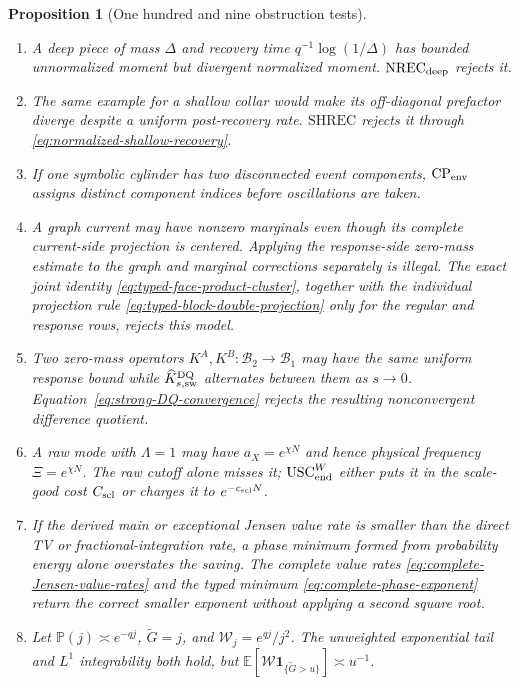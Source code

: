 \documentclass[11pt]{article}
\newtheorem{proposition}[theorem]{Proposition}
\newcommand{\cB}{\mathcal B}
\newcommand{\one}{\mathbf 1}
\begin{document}
\begin{proposition}[One hundred and nine obstruction tests]
\begin{enumerate}[label=\textup{(T\arabic*)}]
      the latter and never infers it from signed TV.
\item A deep piece of mass $\Delta$ and recovery time
      $q^{-1}\log(1/\Delta)$ has bounded unnormalized moment but divergent
      normalized moment.  $\mathrm{NREC}_{\rm deep}$ rejects it.
\item The same example for a shallow collar would make its off-diagonal
      prefactor diverge despite a uniform post-recovery rate.
      $\mathrm{SHREC}$ rejects it through
      \eqref{eq:normalized-shallow-recovery}.
\item If one symbolic cylinder has two disconnected event components,
      $\mathrm{CP}_{\rm env}$ assigns distinct component indices before
      oscillations are taken.
\item A graph current may have nonzero marginals even though its complete
      current-side projection is centered.  Applying the response-side
      zero-mass estimate to the graph and marginal corrections separately is
      illegal.  The exact joint identity
      \eqref{eq:typed-face-product-cluster}, together with the individual
      projection rule \eqref{eq:typed-block-double-projection} only for the
      regular and response rows, rejects this model.
\item Two zero-mass operators $K^A,K^B:\cB_2\to\cB_1$ may have the same
      uniform response bound while
      $\widehat K_{s,\rm sw}^{\rm DQ}$ alternates between them as $s\to0$.
      Equation~\eqref{eq:strong-DQ-convergence} rejects the resulting
      nonconvergent difference quotient.
\item A raw mode with $\Lambda=1$ may have $a_X=e^{\chi N}$ and hence
      physical frequency $\Xi=e^{\chi N}$.  The raw cutoff alone misses it;
      $\mathrm{USC}_{\rm end}^{W}$ either puts it in the scale-good cost
      $C_{\rm scl}$ or charges it to $e^{-c_{\rm scl}N}$.
\item If the derived main or exceptional Jensen value rate is smaller than
      the direct TV or fractional-integration rate, a phase minimum formed
      from probability energy alone overstates the saving.  The complete
      value rates \eqref{eq:complete-Jensen-value-rates} and the typed
      minimum \eqref{eq:complete-phase-exponent} return the correct smaller
      exponent without applying a second square root.
\item Let $\mathbb P(j)\asymp e^{-qj}$,
      $\widetilde G=j$, and $\mathscr W_j=e^{qj}/j^2$.  The unweighted
      exponential tail and $L^1$ integrability both hold, but
      $\mathbb E[\mathscr W\one_{\{\widetilde G>u\}}]\asymp u^{-1}$.

\end{enumerate}
\end{proposition}
\end{document}
